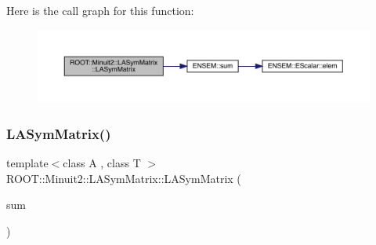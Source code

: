 Here is the call graph for this function\+:
\nopagebreak
\begin{figure}[H]
\begin{center}
\leavevmode
\includegraphics[width=350pt]{d3/d72/classROOT_1_1Minuit2_1_1LASymMatrix_a50f5a1e686ba0b5ac1d296432bdea484_cgraph}
\end{center}
\end{figure}
\mbox{\label{classROOT_1_1Minuit2_1_1LASymMatrix_a252615373ae5ffe035baa9e8221e67e3}} 
\subsubsection{\texorpdfstring{LASymMatrix()}{LASymMatrix()}\hspace{0.1cm}{\footnotesize\ttfamily [5/30]}}
{\footnotesize\ttfamily template$<$class A , class T $>$ \\
R\+O\+O\+T\+::\+Minuit2\+::\+L\+A\+Sym\+Matrix\+::\+L\+A\+Sym\+Matrix (\begin{DoxyParamCaption}\item[{const \mbox{\hyperlink{classROOT_1_1Minuit2_1_1ABObj}{A\+B\+Obj}}$<$ \mbox{\hyperlink{classROOT_1_1Minuit2_1_1sym}{sym}}, \mbox{\hyperlink{classROOT_1_1Minuit2_1_1ABSum}{A\+B\+Sum}}$<$ \mbox{\hyperlink{classROOT_1_1Minuit2_1_1ABObj}{A\+B\+Obj}}$<$ \mbox{\hyperlink{classROOT_1_1Minuit2_1_1sym}{sym}}, \mbox{\hyperlink{classROOT_1_1Minuit2_1_1LASymMatrix}{L\+A\+Sym\+Matrix}}, T $>$, \mbox{\hyperlink{classROOT_1_1Minuit2_1_1ABObj}{A\+B\+Obj}}$<$ \mbox{\hyperlink{classROOT_1_1Minuit2_1_1sym}{sym}}, A, T $>$ $>$, T $>$ \&}]{sum }\end{DoxyParamCaption})\hspace{0.3cm}{\ttfamily [inline]}}

